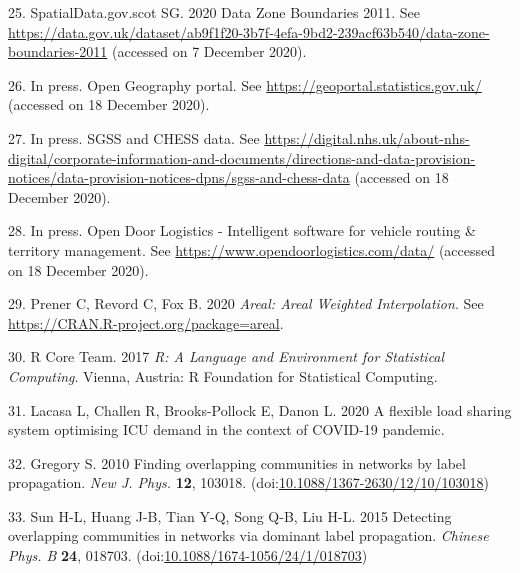 \documentclass[
]{article}
\begin{document}
\leavevmode\hypertarget{ref-spatialdata.gov.scotDataZoneBoundaries2020}{}%
25. SpatialData.gov.scot SG. 2020 Data Zone Boundaries 2011. See
\url{https://data.gov.uk/dataset/ab9f1f20-3b7f-4efa-9bd2-239acf63b540/data-zone-boundaries-2011}
(accessed on 7 December 2020).

\leavevmode\hypertarget{ref-OpenGeographyPortala}{}%
26. In press. Open Geography portal. See
\url{https://geoportal.statistics.gov.uk/} (accessed on 18 December
2020).

\leavevmode\hypertarget{ref-SGSSCHESSData}{}%
27. In press. SGSS and CHESS data. See
\url{https://digital.nhs.uk/about-nhs-digital/corporate-information-and-documents/directions-and-data-provision-notices/data-provision-notices-dpns/sgss-and-chess-data}
(accessed on 18 December 2020).

\leavevmode\hypertarget{ref-OpenDoorLogistics}{}%
28. In press. Open Door Logistics - Intelligent software for vehicle
routing \& territory management. See
\url{https://www.opendoorlogistics.com/data/} (accessed on 18 December
2020).

\leavevmode\hypertarget{ref-prenerArealArealWeighted2020}{}%
29. Prener C, Revord C, Fox B. 2020 \emph{Areal: Areal Weighted
Interpolation}. See \url{https://CRAN.R-project.org/package=areal}.

\leavevmode\hypertarget{ref-rcoreteamLanguageEnvironmentStatistical2017}{}%
30. R Core Team. 2017 \emph{R: A Language and Environment for
Statistical Computing}. Vienna, Austria: R Foundation for Statistical
Computing.

\leavevmode\hypertarget{ref-lacasaFlexibleLoadSharing2020}{}%
31. Lacasa L, Challen R, Brooks-Pollock E, Danon L. 2020 A flexible load
sharing system optimising ICU demand in the context of COVID-19
pandemic.

\leavevmode\hypertarget{ref-gregoryFindingOverlappingCommunities2010}{}%
32. Gregory S. 2010 Finding overlapping communities in networks by label
propagation. \emph{New J. Phys.} \textbf{12}, 103018.
(doi:\href{https://doi.org/10.1088/1367-2630/12/10/103018}{10.1088/1367-2630/12/10/103018})

\leavevmode\hypertarget{ref-sunDetectingOverlappingCommunities2015}{}%
33. Sun H-L, Huang J-B, Tian Y-Q, Song Q-B, Liu H-L. 2015 Detecting
overlapping communities in networks via dominant label propagation.
\emph{Chinese Phys. B} \textbf{24}, 018703.
(doi:\href{https://doi.org/10.1088/1674-1056/24/1/018703}{10.1088/1674-1056/24/1/018703})

\pagebreak
\end{document}
